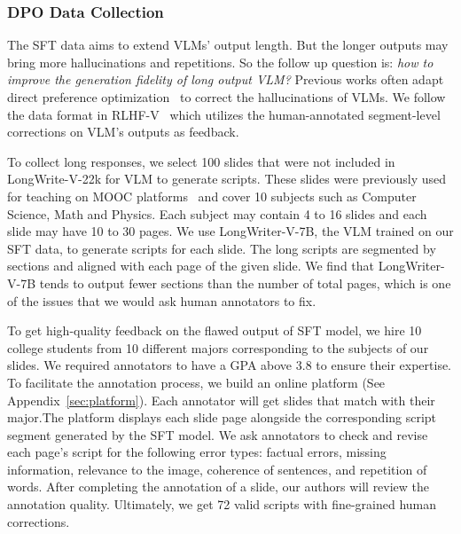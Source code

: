 \subsubsection{DPO Data Collection}
\label{sec:dpo_data_collection}

The SFT data aims to extend VLMs' output length. But the longer outputs may bring more hallucinations and repetitions. So the follow up question is: \textit{how to improve the generation fidelity of long output VLM?} Previous works often adapt direct preference optimization~\cite{rafailov2024direct,liu2024mia} to correct the hallucinations of VLMs. We follow the data format in RLHF-V~\cite{yu2024rlhf} which utilizes the human-annotated segment-level corrections on VLM's outputs as feedback.


 To collect long responses, we select 100 slides that were not included in LongWrite-V-22k for VLM to generate scripts. These slides were previously used for teaching on MOOC platforms~\cite{yu2020mooccube} and cover 10 subjects such as Computer Science, Math and Physics. Each subject may contain 4 to 16 slides and each slide may have 10 to 30 pages. We use LongWriter-V-7B, the VLM trained on our SFT data, to generate scripts for each slide. The long scripts are segmented by sections and aligned with each page of the given slide. We find that LongWriter-V-7B tends to output fewer sections than the number of total pages, which is one of the issues that we would ask human annotators to fix.



 To get high-quality feedback on the flawed output of SFT model, we hire 10 college students from 10 different majors corresponding to the subjects of our slides. We required annotators to have a GPA above 3.8 to ensure their expertise. To facilitate the annotation process, we build an online platform (See Appendix~\ref{sec:platform}). Each annotator will get slides that match with their major.The platform displays each slide page alongside the corresponding script segment generated by the SFT model. We ask annotators to check and revise each page's script for the following error types: factual errors, missing information, relevance to the image, coherence of sentences, and repetition of words. After completing the annotation of a slide, our authors will review the annotation quality. Ultimately, we get 72 valid scripts with fine-grained human corrections.




